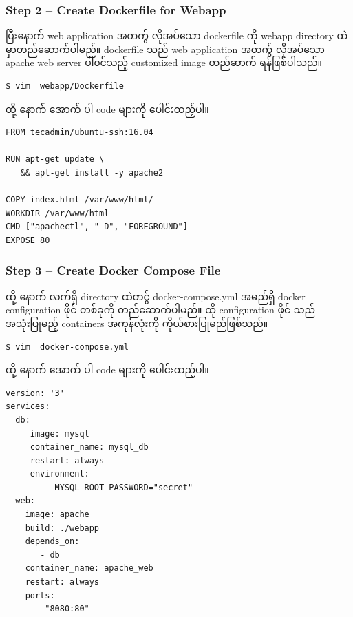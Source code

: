 \hypertarget{step-2-create-dockerfile-for-webapp-1}{%
\subsubsection{Step 2 -- Create Dockerfile for
Webapp}\label{step-2-create-dockerfile-for-webapp-1}}

ပြီးနောက် web application အတက်ွ လိုအပ်သော dockerfile ကို webapp
directory ထဲမှာတည်ဆောက်ပါမည်။ dockerfile သည် web application အတက်ွ
လိုအပ်သော apache web server ပါ၀င်သည့် customized image တည်ဆာက်
ရန်ဖြစ်ပါသည်။

\begin{verbatim}
$ vim  webapp/Dockerfile
\end{verbatim}

ထို့ နောက် အောက် ပါ code များကို ပေါင်းထည့်ပါ။

\begin{verbatim}
FROM tecadmin/ubuntu-ssh:16.04

RUN apt-get update \
   && apt-get install -y apache2

COPY index.html /var/www/html/
WORKDIR /var/www/html
CMD ["apachectl", "-D", "FOREGROUND"]
EXPOSE 80
\end{verbatim}

\hypertarget{step-3-create-docker-compose-file}{%
\subsubsection{Step 3 -- Create Docker Compose
File}\label{step-3-create-docker-compose-file}}

ထို့ နောက် လက်ရှိ directory ထဲတင်ွ docker-compose.yml အမည်ရှိ docker
configuration ဖိုင် တစ်ခုကို တည်ဆောက်ပါမည်။ ထို configuration ဖိုင် သည်
အသုံးပြုမည့် containers အကုန်လုံးကို ကိုယ်စားပြုမည်ဖြစ်သည်။

\begin{verbatim}
$ vim  docker-compose.yml
\end{verbatim}

ထို့ နောက် အောက် ပါ code များကို ပေါင်းထည့်ပါ။

\begin{verbatim}
version: '3'
services:
  db:
     image: mysql
     container_name: mysql_db
     restart: always
     environment:
        - MYSQL_ROOT_PASSWORD="secret"
  web:
    image: apache
    build: ./webapp
    depends_on:
       - db
    container_name: apache_web
    restart: always
    ports:
      - "8080:80"
\end{verbatim}

